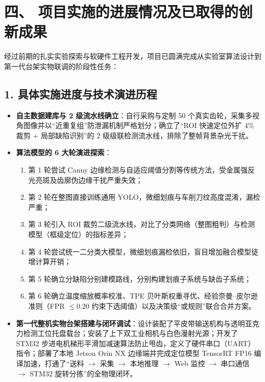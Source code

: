 \section*{四、 项目实施的进展情况及已取得的创新成果}

经过前期的扎实实验探索与软硬件工程开发，项目已圆满完成从实验室算法设计到第一代台架实物联调的阶段性任务：

\subsection*{1. 具体实施进度与技术演进历程}
\begin{itemize}
    \item \textbf{自主数据建库与 2 级流水线确立}：自行采购与定制 50 个真实齿轮，采集多视角图像并以“近重复组”防泄漏机制严格划分；确立了“ROI 快速定位外扩 4\% 裁剪 + 局部缺陷识别”的 2 级级联检测流水线，排除了整帧背景杂光干扰。
    \item \textbf{算法模型的 6 大轮演进探索}：
    \begin{enumerate}
        \item 第 1 轮尝试 Canny 边缘检测与自适应阈值分割等传统方法，受金属强反光亮斑及齿廓伪边缘干扰严重失效；
        \item 第 2 轮在整图直接训练通用 YOLO，微细划痕与车削刀纹高度混淆，漏检严重；
        \item 第 3 轮引入 ROI 裁剪二级流水线，对比了分类网络（整图粗判）与检测模型（框级定位）的指标差异；
        \item 第 4 轮尝试统一二分类大模型，微细划痕漏检依旧，盲目增加融合模型徒增计算开销；
        \item 第 5 轮确立分缺陷分别建模路线，分别构建划痕子系统与缺齿子系统；
        \item 第 6 轮确立温度缩放概率校准、TPE 贝叶斯权重寻优、经验奈曼–皮尔逊准则（FPR $\le 0.20$ 约束下选阈值）以及决策级“或规则”联合合并方案。
    \end{enumerate}
    \item \textbf{第一代整机实物台架搭建与闭环调试}：设计装配了平皮带输送机构与透明亚克力检测工位托盘载台；安装了上下双工业相机与白色漫射光源；开发了 STM32 步进电机梯形平滑加减速算法防止甩齿，定义了硬件串口（UART）指令；部署了本地 Jetson Orin NX 边缘端并完成定位模型 TensorRT FP16 编译加速，打通了“送料 $\rightarrow$ 采集 $\rightarrow$ 本地推理 $\rightarrow$ Web 监控 $\rightarrow$ 串口通信 $\rightarrow$ STM32 旋转分拣”的全物理闭环。
\end{itemize}

